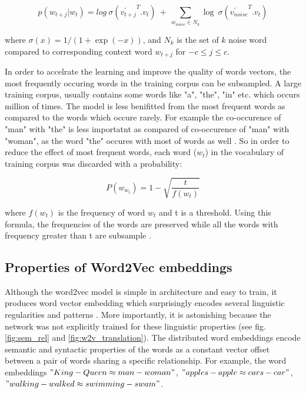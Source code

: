\begin{equation}
p(w_{t+j}|w_t)=log\ \sigma({{v^{'}_{t+j}}^{T}}.{v_t})\ +\  \sum_{w_{noise}{\in}N_{k}} \log\ \sigma({{v^{'}_{noise}}^T}.v_{t})
\end{equation}

\noindent where $\sigma(x)=1/(1+\exp(-x))$, and $N_k$ is the set of $k$ noise word compared to corresponding context word $w_{t+j}$ for $-c \leq j \leq c$. 

In order to accelrate the learning and improve the quality of words vectors, the most frequently occuring words in the training corpus can be subsampled. A large training corpus, usually contains some words like "a", "the", "in" etc. which occurs million of times. The model is less benifitted from the most frequent words as compared to the words which occure rarely. For example the co-occurence of "man" with "the" is less importatnt as compared of co-occurence of "man" with "woman", as the word "the" occures with most of words as well \cite{w2v:mikolov_2013_distributed}. So in order to reduce the effect of most frequent words, each word ($w_{t}$) in the vocabulary of training corpus was discarded with a probability:

\begin{equation} \label{eqn:subsampling}
P(w_{w_t})= 1- \sqrt{ \frac {t}{f(w_{t})}}
\end{equation}

\noindent where $f(w_{t})$ is the frequency of word $w_{t}$ and t is a threshold. Using this formula, the  frequencies of the words are preserved while all the words with frequency greater than t are subsample \cite{w2v:mikolov_2013_distributed}.


\subsection{Properties of Word2Vec embeddings}

Although the word2vec model is simple in architecture and easy to train, it produces word vector embedding which surprisingly encodes several linguistic regularities and patterns \cite{w2v:language_similarities, w2v:mikolov_2013_distributed}. More importantly, it is astonishing because the network was not explicitly trained for these linguistic properties (see fig. \ref{fig:sem_rel} and \ref{fig:w2v_translation}). The distributed word embeddings encode semantic and syntactic properties of the words as a constant vector offset between a pair of words sharing a specific relationship\cite{w2v:mikolov_2013_distributed}. For example, the word embeddings $"King - Queen \approx man - woman"$, $"apples - apple \approx cars - car"$, $"walking - walked \approx swimming - swam"$.

